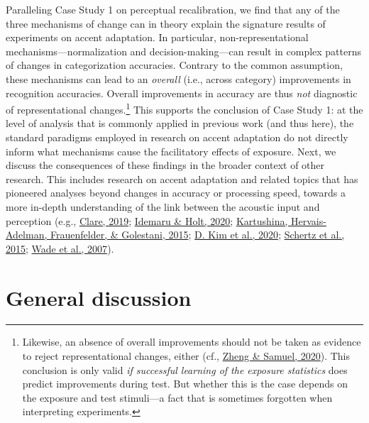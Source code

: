 \documentclass[
  11pt,
  man,floatsintext]{apa6}
\begin{document}
Paralleling Case Study 1 on perceptual recalibration, we find that any of the three mechanisms of change can in theory explain the signature results of experiments on accent adaptation. In particular, non-representational mechanisms---normalization and decision-making---can result in complex patterns of changes in categorization accuracies. Contrary to the common assumption, these mechanisms can lead to an \emph{overall} (i.e., across category) improvements in recognition accuracies. Overall improvements in accuracy are thus \emph{not} diagnostic of representational changes.\footnote{Likewise, an absence of overall improvements should not be taken as evidence to reject representational changes, either (cf., \protect\hyperlink{ref-zheng-samuel2020}{Zheng \& Samuel, 2020}). This conclusion is only valid \emph{if successful learning of the exposure statistics} does predict improvements during test. But whether this is the case depends on the exposure and test stimuli---a fact that is sometimes forgotten when interpreting experiments.} This supports the conclusion of Case Study 1: at the level of analysis that is commonly applied in previous work (and thus here), the standard paradigms employed in research on accent adaptation do not directly inform what mechanisms cause the facilitatory effects of exposure. Next, we discuss the consequences of these findings in the broader context of other research. This includes research on accent adaptation and related topics that has pioneered analyses beyond changes in accuracy or processing speed, towards a more in-depth understanding of the link between the acoustic input and perception (e.g., \protect\hyperlink{ref-clare2019}{Clare, 2019}; \protect\hyperlink{ref-idemaru-holt2020}{Idemaru \& Holt, 2020}; \protect\hyperlink{ref-kartushina2015}{Kartushina, Hervais-Adelman, Frauenfelder, \& Golestani, 2015}; \protect\hyperlink{ref-kim2020}{D. Kim et al., 2020}; \protect\hyperlink{ref-schertz2015}{Schertz et al., 2015}; \protect\hyperlink{ref-wade2007}{Wade et al., 2007}).

\hypertarget{general-discussion}{%
\section{General discussion}\label{general-discussion}}
\end{document}
